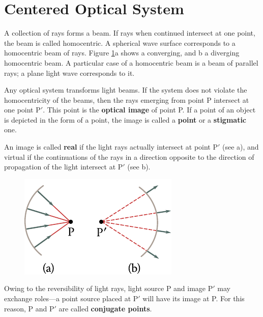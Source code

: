 \section{Centered Optical System}\label{sec:16_7}

A collection of rays forms a beam.
If rays when continued intersect at one point, the beam is called homocentric.
A spherical wave surface corresponds to a homocentric beam of rays.
Figure \ref{fig:16_12}a shows a converging, and b a diverging homocentric beam.
A particular case of a homocentric beam is a beam of parallel rays; a plane light wave corresponds to it.

Any optical system transforms light beams.
If the system does not violate the homocentricity of the beams, then the rays emerging from point P intersect at one point P$'$.
This point is the \textbf{optical image} of point P. If a point of an object is depicted in the form of
a point, the image is called a \textbf{point} or a \textbf{stigmatic} one.

An image is called \textbf{real} if the light rays actually intersect at point P$'$ (see a), and virtual if the continuations of the rays in a direction opposite to the direction of propagation of the light intersect at P$'$ (see b).

\begin{figure}[t]
	\begin{center}
		\includegraphics[scale=1]{figures/ch_16/fig_16_12.pdf}
        \caption[]{}
		\label{fig:16_12}
	\end{center}
	\vspace{-0.8cm}
\end{figure}

Owing to the reversibility of light rays, light source P and image P$'$ may exchange roles---a point source placed at P$'$ will have its image at P.
For this reason, P and P$'$ are called \textbf{conjugate points}.

